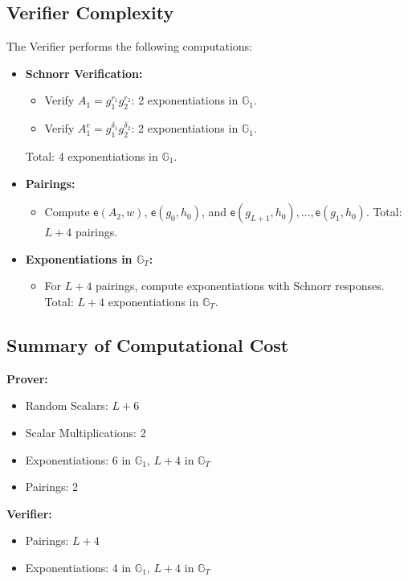 {\subsection{Verifier Complexity}
The Verifier performs the following computations:
\begin{itemize}
    \item \textbf{Schnorr Verification:}
    \begin{itemize}
        \item Verify $A_1 = g_1^{r_1} g_2^{r_2}$: 2 exponentiations in $\mathbb{G}_1$.
        \item Verify $A_1^e = g_1^{\delta_1} g_2^{\delta_2}$: 2 exponentiations in $\mathbb{G}_1$.
    \end{itemize}
    Total: 4 exponentiations in $\mathbb{G}_1$.
    \item \textbf{Pairings:}
    \begin{itemize}
        \item Compute $\mathsf{e}(A_2, w)$, $\mathsf{e}(g_0, h_0)$, and $\mathsf{e}(g_{L+1}, h_0), \ldots, \mathsf{e}(g_1, h_0)$. Total: $L+4$ pairings.
    \end{itemize}
    \item \textbf{Exponentiations in $\mathbb{G}_T$:}
    \begin{itemize}
        \item For $L+4$ pairings, compute exponentiations with Schnorr responses. Total: $L+4$ exponentiations in $\mathbb{G}_T$.
    \end{itemize}
\end{itemize}

\subsection{Summary of Computational Cost}
\textbf{Prover:}
\begin{itemize}
    \item Random Scalars: $L+6$
    \item Scalar Multiplications: 2
    \item Exponentiations: 6 in $\mathbb{G}_1$, $L+4$ in $\mathbb{G}_T$
    \item Pairings: 2
\end{itemize}

\textbf{Verifier:}
\begin{itemize}
    \item Pairings: $L+4$
    \item Exponentiations: 4 in $\mathbb{G}_1$, $L+4$ in $\mathbb{G}_T$
\end{itemize}


}
